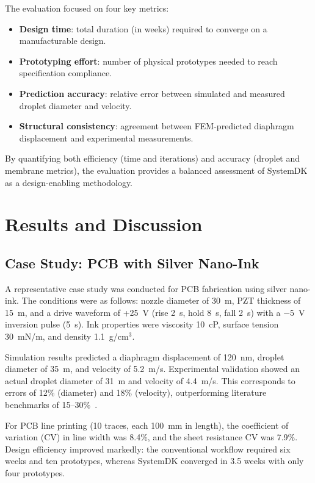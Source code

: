 \documentclass[conference]{IEEEtran}
\begin{document}
The evaluation focused on four key metrics:
\begin{itemize}
  \item \textbf{Design time}: total duration (in weeks) required to converge on a manufacturable design.  
  \item \textbf{Prototyping effort}: number of physical prototypes needed to reach specification compliance.  
  \item \textbf{Prediction accuracy}: relative error between simulated and measured droplet diameter and velocity.  
  \item \textbf{Structural consistency}: agreement between FEM-predicted diaphragm displacement and experimental measurements.  
\end{itemize}

By quantifying both efficiency (time and iterations) and accuracy (droplet and membrane metrics), the evaluation provides a balanced assessment of SystemDK as a design-enabling methodology.

\section{Results and Discussion}
\subsection{Case Study: PCB with Silver Nano-Ink}
A representative case study was conducted for PCB fabrication using silver nano-ink.  
The conditions were as follows: nozzle diameter of 30~\textmu m, PZT thickness of 15~\textmu m, and a drive waveform of +25~V (rise 2~\textmu s, hold 8~\textmu s, fall 2~\textmu s) with a $-5$~V inversion pulse (5~\textmu s).  
Ink properties were viscosity 10~cP, surface tension 30~mN/m, and density 1.1~g/cm$^3$.

Simulation results predicted a diaphragm displacement of 120~nm, droplet diameter of 35~\textmu m, and velocity of 5.2~m/s.  
Experimental validation showed an actual droplet diameter of 31~\textmu m and velocity of 4.4~m/s.  
This corresponds to errors of 12\% (diameter) and 18\% (velocity), outperforming literature benchmarks of 15--30\%~\cite{boccio2003,lei2012}.  

For PCB line printing (10 traces, each 100~mm in length), the coefficient of variation (CV) in line width was 8.4\%, and the sheet resistance CV was 7.9\%.  
Design efficiency improved markedly: the conventional workflow required six weeks and ten prototypes, whereas SystemDK converged in 3.5 weeks with only four prototypes.
\end{document}
